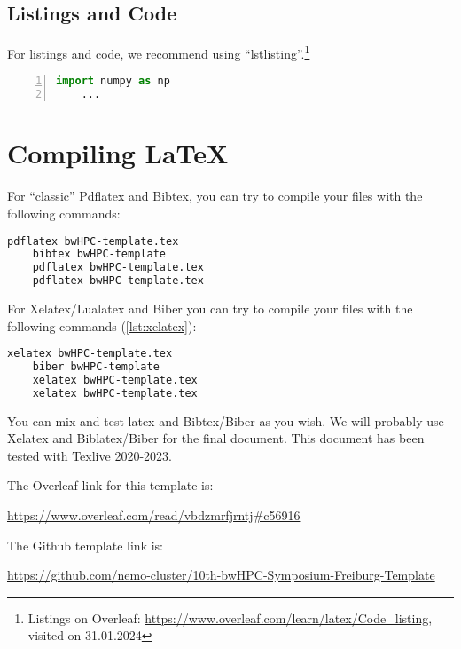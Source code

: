 \documentclass[
  paper       = a4,
  headheight  = 16pt,
  footheight  = 16pt,
  fontsize    = 10pt,
  twoside     = true,
  titlepage   = true,
]{scrartcl}
\begin{document}
\subsection{Listings and Code}

For listings and code, we recommend using \enquote{lstlisting}.\footnote{Listings on Overleaf: \url{https://www.overleaf.com/learn/latex/Code_listing}, visited on 31.01.2024}
\begin{lstlisting}[language=Python, caption=Implementation of ..., label=lst:numpy, numbers=left]
    import numpy as np
    ...
\end{lstlisting}


\section{Compiling \LaTeX}

For \enquote{classic} Pdflatex and Bibtex, you can try to compile your files with the following commands:
\begin{lstlisting}[language=sh, caption=Build Document with Pdflatex and Bibtex, label=lst:pdflatex]
    pdflatex bwHPC-template.tex
    bibtex bwHPC-template
    pdflatex bwHPC-template.tex
    pdflatex bwHPC-template.tex
\end{lstlisting}

For Xelatex/Lualatex and Biber you can try to compile your files with the following commands (\autoref{lst:xelatex}):
\begin{lstlisting}[language=sh, caption=Build Document with Xelatex and Biber, label=lst:xelatex]
    xelatex bwHPC-template.tex
    biber bwHPC-template
    xelatex bwHPC-template.tex
    xelatex bwHPC-template.tex
\end{lstlisting}

You can mix and test \*latex and Bibtex/Biber as you wish.
We will probably use Xelatex and Biblatex/Biber for the final document.
This document has been tested with Texlive 2020-2023.

\vspace{\baselineskip}
\noindent
The Overleaf link for this template is:

\url{https://www.overleaf.com/read/vbdzmrfjrntj#c56916}

\vspace{\baselineskip}
\noindent
The Github template link is:

\url{https://github.com/nemo-cluster/10th-bwHPC-Symposium-Freiburg-Template}

\end{document}
